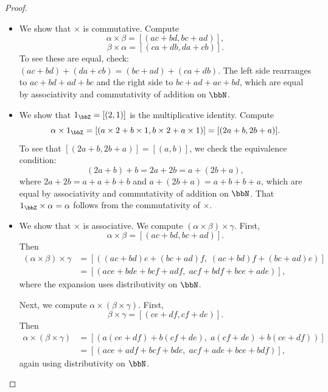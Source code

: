 \begin{proof}
\begin{enumerate}
    \begin{itemize}
    
        \item We show that $\times$ is commutative. Compute
        $$\alpha \times \beta = [(ac + bd, bc + ad)],$$
        $$\beta \times \alpha = [(ca + db, da + cb)].$$
        To see these are equal, check: $(ac+bd) + (da+cb) = (bc+ad) + (ca+db)$. The left side rearranges to $ac+bd+ad+bc$ and the right side to $bc+ad+ac+bd$, which are equal by associativity and commutativity of addition on $\bbN$.

        \item We show that $1_\bbZ = [(2,1)]$ is the multiplicative identity. Compute
        $$\alpha \times 1_\bbZ = [(a \times 2 + b \times 1, b \times 2 + a \times 1)] = [(2a + b, 2b + a)].$$
        To see that $[(2a+b, 2b+a)] = [(a,b)]$, we check the equivalence condition:
        $$(2a + b) + b = 2a + 2b = a + (2b + a),$$
        where $2a + 2b = a + a + b + b$ and $a + (2b + a) = a + b + b + a$, which are equal by associativity and commutativity of addition on $\bbN$. That $1_\bbZ \times \alpha = \alpha$ follows from the commutativity of $\times$.

        \item We show that $\times$ is associative. We compute $(\alpha \times \beta) \times \gamma$. First,
        $$\alpha \times \beta = [(ac + bd, bc + ad)].$$
        Then
        \begin{align*}
        (\alpha \times \beta) \times \gamma &= [((ac+bd)e + (bc+ad)f,\; (ac+bd)f + (bc+ad)e)] \\
        &= [(ace + bde + bcf + adf,\; acf + bdf + bce + ade)],
        \end{align*}
        where the expansion uses distributivity on $\bbN$.

        Next, we compute $\alpha \times (\beta \times \gamma)$. First,
        $$\beta \times \gamma = [(ce + df, cf + de)].$$
        Then
        \begin{align*}
        \alpha \times (\beta \times \gamma) &= [(a(ce+df) + b(cf+de),\; a(cf+de) + b(ce+df))] \\
        &= [(ace + adf + bcf + bde,\; acf + ade + bce + bdf)],
        \end{align*}
        again using distributivity on $\bbN$.


\end{itemize}
\end{enumerate}
\end{proof}
